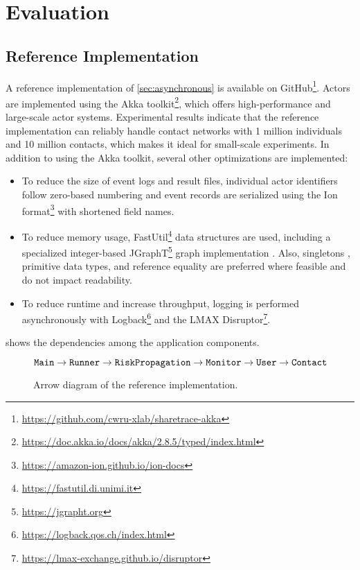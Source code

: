 \chapter{Evaluation}

\section{Reference Implementation}

A reference implementation of \cref{sec:asynchronous} is available on GitHub\footnote{\url{https://github.com/cwru-xlab/sharetrace-akka}}. Actors are implemented using the Akka toolkit\footnote{\url{https://doc.akka.io/docs/akka/2.8.5/typed/index.html}}, which offers high-performance and large-scale actor systems. Experimental results indicate that the reference implementation can reliably handle contact networks with 1 million individuals and 10 million contacts, which makes it ideal for small-scale experiments. In addition to using the Akka toolkit, several other optimizations are implemented:
\begin{itemize}
  \item To reduce the size of event logs and result files, individual actor identifiers follow zero-based numbering and event records are serialized using the Ion format\footnote{\url{https://amazon-ion.github.io/ion-docs}} with shortened field names.
  \item To reduce memory usage, FastUtil\footnote{\url{https://fastutil.di.unimi.it}} data structures are used, including a specialized integer-based JGraphT\footnote{\url{https://jgrapht.org}} graph implementation \citep{Michail2020}. Also, singletons \citep{Gamma1995}, primitive data types, and reference equality are preferred where feasible and do not impact readability.
  \item To reduce runtime and increase throughput, logging is performed asynchronously with Logback\footnote{\url{https://logback.qos.ch/index.html}} and the LMAX Disruptor\footnote{\url{https://lmax-exchange.github.io/disruptor}}.
\end{itemize}

 shows the dependencies among the application components.
\begin{figure}[htbp]
\begin{equation*}
  \texttt{Main} \rightarrow \texttt{Runner} \rightarrow \texttt{RiskPropagation} \rightarrow \texttt{Monitor} \rightarrow \texttt{User} \rightarrow \texttt{Contact}
\end{equation*}
\caption[Arrow diagram of the reference implementation]{Arrow diagram of the reference implementation.}
\label{fig:arrow-diagram}
\end{figure}

